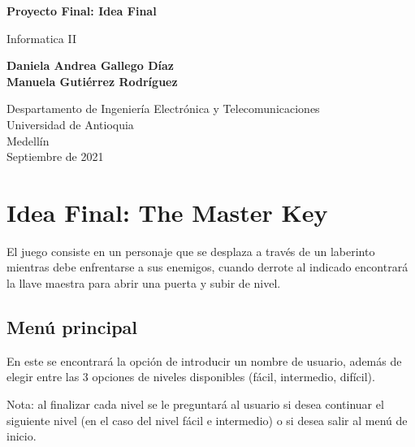 \documentclass{article}
\begin{document}
\begin{titlepage}
    \begin{center}
        \vspace*{1cm}
            
        \Huge
        \textbf {Proyecto Final: Idea Final}
            
        \vspace{0.5cm}
        \LARGE
        Informatica II
            
        \vspace{1.5cm}
            
        \textbf{Daniela Andrea Gallego Díaz\\ Manuela Gutiérrez Rodríguez }
            
        \vfill
            
        \vspace{0.8cm}
            
        \Large
        Despartamento de Ingeniería Electrónica y Telecomunicaciones\\
        Universidad de Antioquia\\
        Medellín\\
        Septiembre de 2021
            
    \end{center}
\end{titlepage}

\tableofcontents
\newpage

\section{Idea Final: The Master Key} \label{contenido}

El juego consiste en un personaje que se desplaza a través de un laberinto mientras debe enfrentarse a sus enemigos, cuando derrote al indicado encontrará la llave maestra para abrir una puerta y subir de nivel.


\subsection{Menú principal}
En este se encontrará la opción de introducir un nombre de usuario, además de elegir entre las 3 opciones de niveles disponibles (fácil, intermedio, difícil).


Nota: al finalizar cada nivel se le preguntará al usuario si desea continuar el siguiente nivel (en el caso del nivel fácil e intermedio) o si desea salir al menú de inicio.
\end{document}
